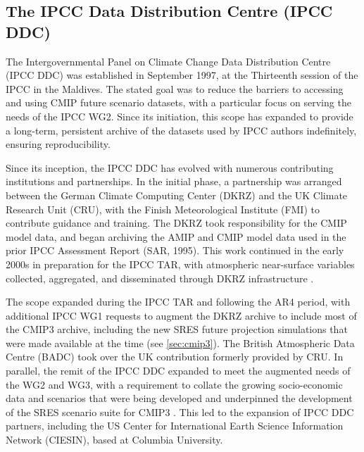 \documentclass[manuscript]{copernicus}
\newcommand{\mycomment}[1]{}
\def\cred#1{{\color{red}#1}}
\begin{document}
\mycomment{
CMIP6 current nodes - https://aims2.llnl.gov/nodes - 30
Very early CMIP5 http://web.archive.org/web/20111015000202/http://pcmdi3.llnl.gov/esgcet/home.htm 7 nodes ESG-CET + BADC, WDCC, NCI
ESG-CET NCAR, LLNL, ORNL https://extranet.gfdl.noaa.gov/~vb/curator/AR5-20071017/ESG-CET200710.pdf Oct 2007
2013 Aspen workshop - https://www.wcrp-climate.org/images/modelling/WGCM/WGCM17/WGCM17_report.pdf;
Middleton, Foster, and Williams et al., 2006: Earth System Grid II final report 2001-2006 SCIDAC https://www.osti.gov/servlets/purl/1113798 https://doi.org/10.2172/1113798
}


\subsection{The IPCC Data Distribution Centre (IPCC DDC)}
\label{sec:IPCC-DDC}

The Intergovernmental Panel on Climate Change Data Distribution Centre (IPCC DDC) was established in September 1997, at the Thirteenth session of the IPCC in the Maldives. The stated goal was to reduce the barriers to accessing and using CMIP future scenario datasets, with a particular focus on serving the needs of the IPCC WG2. Since its initiation, this scope has expanded to provide a long-term, persistent archive of the datasets used by IPCC authors indefinitely, ensuring reproducibility.

Since its inception, the IPCC DDC has evolved with numerous contributing institutions and partnerships. In the initial phase, a partnership was arranged between the German Climate Computing Center (DKRZ) and the UK Climate Research Unit (CRU), with the Finish Meteorological Institute (FMI) to contribute guidance and training. The DKRZ took responsibility for the CMIP model data, and began archiving the AMIP and CMIP model data used in the prior IPCC Assessment Report (SAR, 1995). This work continued in the early 2000s in preparation for the IPCC TAR, with atmospheric near-surface variables collected, aggregated, and disseminated through DKRZ infrastructure \citep{stockhause_twenty-five_2022}.

The scope expanded during the IPCC TAR and following the AR4 period, with additional IPCC WG1 requests to augment the DKRZ archive to include most of the CMIP3 archive, including the new SRES future projection simulations that were made available at the time (see \autoref{sec:cmip3}). The British Atmospheric Data Centre (BADC) took over the UK contribution formerly provided by CRU. In parallel, the remit of the IPCC DDC expanded to meet the augmented needs of the WG2 and WG3, with a requirement to collate the growing socio-economic data and scenarios that were being developed and underpinned the development of the SRES scenario suite for CMIP3 \citep{nakicenovic_summary_2000}. This led to the expansion of IPCC DDC partners, including the US Center for International Earth Science Information Network (CIESIN), based at Columbia University. 
\end{document}
